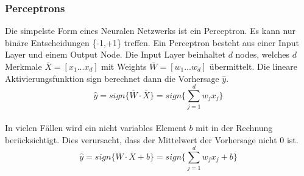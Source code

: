 
\subsubsection{Perceptrons}
Die simpelste Form eines Neuralen Netzwerks ist ein Perceptron. Es kann nur binäre Entscheidungen \{-1,+1\} treffen. Ein Perceptron besteht aus einer Input Layer und einem Output Node.
Die Input Layer beinhaltet $d$ nodes, welches $d$ Merkmale $\overline{X} = [x_1...x_d]$ mit Weights $\overline{W} = [w_1...w_d]$ übermittelt. Die lineare Aktivierungsfunktion sign berechnet
dann die Vorhersage $\hat{y}$. \cite{CA18}\\
$$\hat{y} = sign\{\overline{W} \cdot \overline{X}\} = sign\{\sum\limits^{d}_{j=1}w_jx_j\}$$\\
In vielen Fällen wird ein nicht variables Element $b$ mit in der Rechnung berücksichtigt. Dies verursacht, dass der Mittelwert der Vorhersage nicht 0 ist. \cite{CA18}\\
$$\hat{y} = sign\{\overline{W} \cdot \overline{X} + b\} = sign\{\sum\limits^{d}_{j=1}w_jx_j + b\}$$\\
